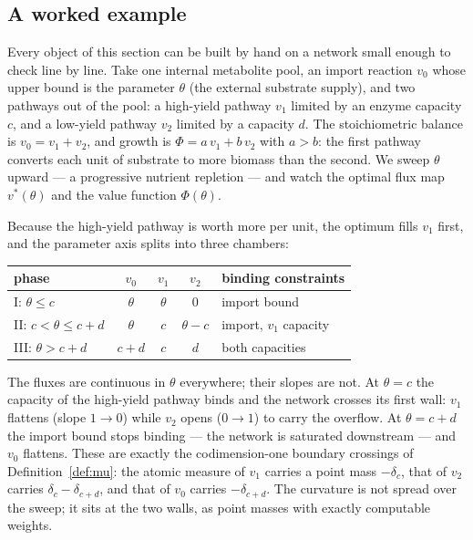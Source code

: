 \documentclass[11pt,a4paper]{article}
\theoremstyle{plain}
\theoremstyle{definition}
\theoremstyle{remark}
\begin{document}
\subsection{A worked example}\label{sec:example}

Every object of this section can be built by hand on a network
small enough to check line by line. Take one internal metabolite
pool, an import reaction $v_0$ whose upper bound is the parameter
$\theta$ (the external substrate supply), and two pathways out of
the pool: a high-yield pathway $v_1$ limited by an enzyme capacity
$c$, and a low-yield pathway $v_2$ limited by a capacity $d$. The
stoichiometric balance is $v_0 = v_1 + v_2$, and growth is
$\Phi = a\,v_1 + b\,v_2$ with $a > b$: the first pathway converts
each unit of substrate to more biomass than the second. We sweep
$\theta$ upward --- a progressive nutrient repletion --- and watch
the optimal flux map $v^*(\theta)$ and the value function
$\Phi(\theta)$.

Because the high-yield pathway is worth more per unit, the optimum
fills $v_1$ first, and the parameter axis splits into three
chambers:
\begin{center}
\small
\begin{tabular}{lcccl}
\toprule
phase & $v_0$ & $v_1$ & $v_2$ & binding constraints \\
\midrule
I: $\theta \le c$ & $\theta$ & $\theta$ & $0$ & import bound \\
II: $c < \theta \le c + d$ & $\theta$ & $c$ & $\theta - c$ & import, $v_1$ capacity \\
III: $\theta > c + d$ & $c + d$ & $c$ & $d$ & both capacities \\
\bottomrule
\end{tabular}
\end{center}
The fluxes are continuous in $\theta$ everywhere; their slopes are
not. At $\theta = c$ the capacity of the high-yield pathway binds
and the network crosses its first wall: $v_1$ flattens (slope $1
\to 0$) while $v_2$ opens ($0 \to 1$) to carry the overflow. At
$\theta = c + d$ the import bound stops binding --- the network is
saturated downstream --- and $v_0$ flattens. These are exactly the
codimension-one boundary crossings of Definition~\ref{def:mu}: the
atomic measure of $v_1$ carries a point mass $-\delta_{c}$, that of
$v_2$ carries $\delta_c - \delta_{c+d}$, and that of $v_0$ carries
$-\delta_{c+d}$. The curvature is not spread over the sweep; it
sits at the two walls, as point masses with exactly computable
weights.
\end{document}
